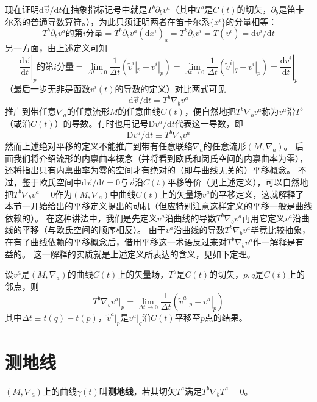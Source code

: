现在证明$\mathrm{d}\vec{v} / \mathrm{d}t$在抽象指标记号中就是$T^b\partial_bv^a$（其中$T^b$是$C(t)$的切矢，$\partial_b$是笛卡尔系的普通导数算符。），为此只须证明两者在笛卡尔系$\{x^i\}$的分量相等：
$$T^b\partial_bv^a\text{的第$i$分量} = T^b\partial_bv^a(\mathrm{d}x^i)_a = T^b\partial_bv^i = T(v^i) = \mathrm{d}v^i / \mathrm{d}t$$
另一方面，由上述定义可知
$$\left.\frac{\mathrm{d}\vec{v}}{\mathrm{d}t}\right|_p\text{的第$i$分量} = \lim_{\Delta t \to 0}\frac{1}{\Delta t}(\tilde v^i|_p - v^i|_p) = \lim_{\Delta t \to 0}\frac{1}{\Delta t}(\tilde v^i|_q - v^i|_p) = \left.\frac{\mathrm{d}v^i}{\mathrm{d}t}\right|_p$$
（最后一步无非是函数$v^i(t)$的导数的定义）对比两式可见
$$\mathrm{d}\vec{v} / \mathrm{d}t = T^b\nabla_bv^a$$
推广到带任意$\nabla_a$的任意流形$M$的任意曲线$C(t)$，便自然地把$T^b\nabla_bv^a$称为$v^a$沿$T^b$（或沿$C(t)$）的导数。有时也用记号$\mathrm{D}v^a / \mathrm{d}t$代表这一导数，即
$$\mathrm{D}v^a / \mathrm{d}t \equiv T^b\nabla_bv^a$$
然而上述绝对平移的定义不能推广到带有任意联络$\nabla_a$的任意流形$(M, \nabla_a)$。
后面我们将介绍流形的内禀曲率概念（并将看到欧氏和闵氏空间的内禀曲率为零），还将指出只有内禀曲率为零的空间才有绝对的（即与曲线无关的）平移概念。
不过，鉴于欧氏空间中$\mathrm{d}\vec{v} / \mathrm{d}t = 0$与$\vec{v}$沿$C(t)$平移等价（见上述定义），可以自然地把$T^b\nabla_bv^a = 0$作为$(M, \nabla_a)$中曲线$C(t)$上的矢量场$v^a$的平移定义，这就解释了本节一开始给出的平移定义提出的动机（但应特别注意这样定义的平移一般是曲线依赖的）。
在这种讲法中，我们是先定义$v^a$沿曲线的导数$T^b\nabla_bv^a$再用它定义$v^a$沿曲线的平移（与欧氏空间的顺序相反）。
由于$v^a$沿曲线的导数$T^b\nabla_bv^a$毕竟比较抽象，在有了曲线依赖的平移概念后，借用平移这一术语反过来对$T^b\nabla_bv^a$作一解释是有益的。
这一解释的实质就是上述定义所表达的含义，见如下定理。

\begin{theorem}
设$v^a$是$(M, \nabla_a)$的曲线$C(t)$上的矢量场，$T^b$是$C(t)$的切矢，$p, q$是$C(t)$上的邻点，则
$$T^b\nabla_bv^a|_p = \lim_{\Delta t \to 0}\frac{1}{\Delta t}(\tilde v^a|_p - v^a|_p)$$
其中$\Delta t \equiv t(q) - t(p)$，$\tilde v^a|_p$是$v^a|_q$沿$C(t)$平移至$p$点的结果。
\end{theorem}

\section{测地线}

\begin{definition}
$(M, \nabla_a)$上的曲线$\gamma(t)$叫\textbf{测地线}，若其切矢$T^a$满足$T^b\nabla_bT^a = 0$。
\end{definition}

